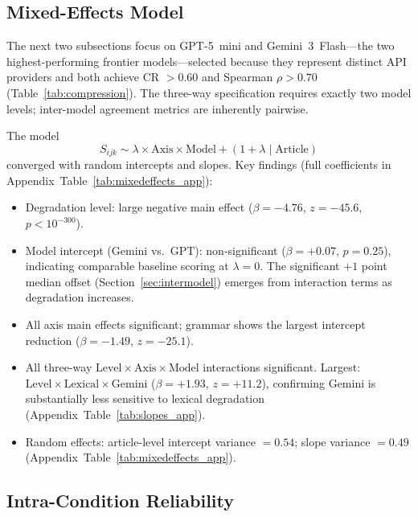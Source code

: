 \documentclass[11pt]{article}
\begin{document}
\subsection{Mixed-Effects Model}
\label{app:mixedeffects_details}

The next two subsections focus on GPT-5~mini and Gemini~3~Flash---the
two highest-performing frontier models---selected because they
represent distinct API providers and both achieve CR $> 0.60$ and
Spearman $\rho > 0.70$ (Table~\ref{tab:compression}). The three-way
specification requires exactly two model levels; inter-model agreement
metrics are inherently pairwise.

The model
\begin{equation}
    S_{ijk} \sim \lambda \times \mathrm{Axis} \times \mathrm{Model} +
    (1 + \lambda \mid \text{Article})
\end{equation}
converged with random intercepts and slopes. Key findings (full
coefficients in Appendix~Table~\ref{tab:mixedeffects_app}):
\begin{itemize}[nosep]
    \item Degradation level: large negative main effect ($\beta =
    -4.76$, $z = -45.6$, $p < 10^{-300}$).
    \item Model intercept (Gemini vs.\ GPT): non-significant ($\beta =
    +0.07$, $p = 0.25$), indicating comparable baseline scoring at
    $\lambda = 0$. The significant $+1$ point median offset
    (Section~\ref{sec:intermodel}) emerges from interaction terms as
    degradation increases.
    \item All axis main effects significant; grammar shows the largest
    intercept reduction ($\beta = -1.49$, $z = -25.1$).
    \item All three-way $\mathrm{Level} \times \mathrm{Axis} \times
    \mathrm{Model}$ interactions significant. Largest: $\mathrm{Level}
    \times \mathrm{Lexical} \times \mathrm{Gemini}$ ($\beta = +1.93$,
    $z = +11.2$), confirming Gemini is substantially less sensitive to
    lexical degradation (Appendix~Table~\ref{tab:slopes_app}).
    \item Random effects: article-level intercept variance $= 0.54$;
    slope variance $= 0.49$ (Appendix~Table~\ref{tab:mixedeffects_app}).
\end{itemize}



\subsection{Intra-Condition Reliability}
\end{document}
